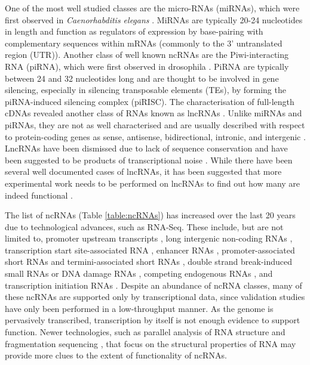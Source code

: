 One of the most well studied classes are the micro-RNAs (miRNAs), which were first observed in \textit{Caenorhabditis elegans} \citep{pmid8252621}. MiRNAs are typically 20-24 nucleotides in length and function as regulators of expression by base-pairing with complementary sequences within mRNAs (commonly to the 3' untranslated region (UTR)). Another class of well known ncRNAs are the Piwi-interacting RNA (piRNA), which were first observed in drosophila \citep{pmid11470406}. PiRNA are typically between 24 and 32 nucleotides long and are thought to be involved in gene silencing, especially in silencing transposable elements (TEs), by forming the piRNA-induced silencing complex (piRISC). The characterisation of full-length cDNAs revealed another class of RNAs known as lncRNAs \citep{pmid12466851}. Unlike miRNAs and piRNAs, they are not as well characterised and are usually described with respect to protein-coding genes as sense, antisense, bidirectional, intronic, and intergenic \citep{pmid19239885}. LncRNAs have been dismissed due to lack of sequence conservation \citep{pmid15495343} and have been suggested to be products of transcriptional noise \citep{pmid15851066}. While there have been several well documented cases of lncRNAs, it has been suggested that more experimental work needs to be performed on lncRNAs to find out how many are indeed functional \citep{pmid23463798}.

The list of ncRNAs (Table \ref{table:ncRNAs}) has increased over the last 20 years due to technological advances, such as RNA-Seq. These include, but are not limited to, promoter upstream transcripts \citep{pmid19056938}, long intergenic non-coding RNAs \citep{pmid21890647, pmid22196729, pmid2943744}, transcription start site-associated RNA \citep{pmid21822281}, enhancer RNAs \citep{pmid20393465}, promoter-associated short RNAs and termini-associated short RNAs \citep{pmid17510325}, double strand break-induced small RNAs \citep{pmid22445173} or DNA damage RNAs \citep{francia2012site}, competing endogenous RNAs \citep{pmid24429633}, and transcription initiation RNAs \citep{pmid19377478}. Despite an abundance of ncRNA classes, many of these ncRNAs are supported only by transcriptional data, since validation studies have only been performed in a low-throughput manner. As the genome is pervasively transcribed, transcription by itself is not enough evidence to support function. Newer technologies, such as parallel analysis of RNA structure \citep{pmid20811459} and fragmentation sequencing \citep{pmid21057495}, that focus on the structural properties of RNA may provide more clues to the extent of functionality of ncRNAs.

